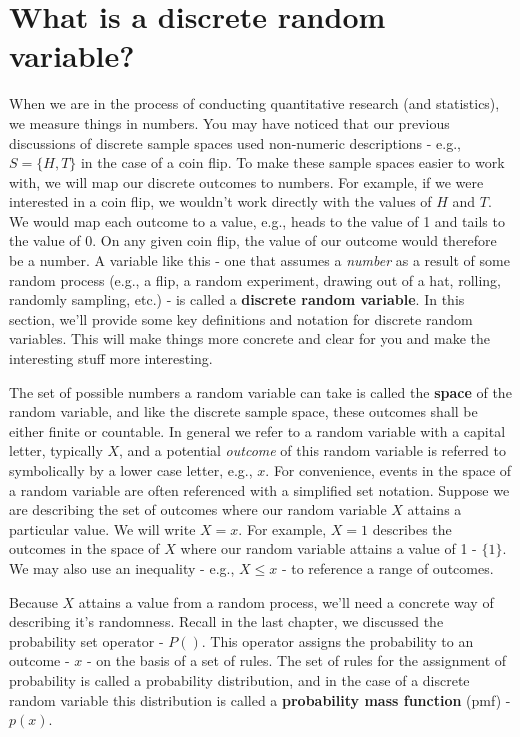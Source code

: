 \documentclass[
]{book}
\theoremstyle{definition}
\theoremstyle{definition}
\theoremstyle{definition}
\theoremstyle{definition}
\theoremstyle{remark}
\begin{document}
\section{What is a discrete random variable?}\label{what-is-a-discrete-random-variable}

When we are in the process of conducting quantitative research (and statistics), we measure things in numbers. You may have noticed that our previous discussions of discrete sample spaces used non-numeric descriptions - e.g., \(S = \{H, T\}\) in the case of a coin flip. To make these sample spaces easier to work with, we will map our discrete outcomes to numbers. For example, if we were interested in a coin flip, we wouldn't work directly with the values of \(H\) and \(T\). We would map each outcome to a value, e.g., heads to the value of 1 and tails to the value of 0. On any given coin flip, the value of our outcome would therefore be a number. A variable like this - one that assumes a \emph{number} as a result of some random process (e.g., a flip, a random experiment, drawing out of a hat, rolling, randomly sampling, etc.) - is called a \textbf{discrete random variable}. In this section, we'll provide some key definitions and notation for discrete random variables. This will make things more concrete and clear for you and make the interesting stuff more interesting.

The set of possible numbers a random variable can take is called the \textbf{space} of the random variable, and like the discrete sample space, these outcomes shall be either finite or countable. In general we refer to a random variable with a capital letter, typically \(X\), and a potential \emph{outcome} of this random variable is referred to symbolically by a lower case letter, e.g., \(x\). For convenience, events in the space of a random variable are often referenced with a simplified set notation. Suppose we are describing the set of outcomes where our random variable \(X\) attains a particular value. We will write \(X = x\). For example, \(X = 1\) describes the outcomes in the space of \(X\) where our random variable attains a value of 1 - \(\{1\}\). We may also use an inequality - e.g., \(X \leq x\) - to reference a range of outcomes.

Because \(X\) attains a value from a random process, we'll need a concrete way of describing it's randomness. Recall in the last chapter, we discussed the probability set operator - \(P()\). This operator assigns the probability to an outcome - \(x\) - on the basis of a set of rules. The set of rules for the assignment of probability is called a probability distribution, and in the case of a discrete random variable this distribution is called a \textbf{probability mass function} (pmf) - \(p(x)\).
\end{document}
